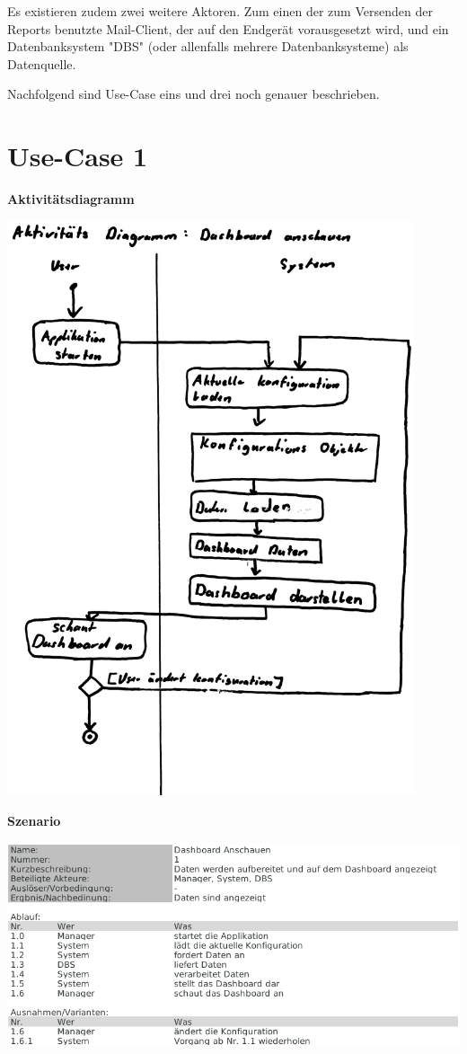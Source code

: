 \documentclass[a4paper]{scrreprt}
\begin{document}
Es existieren zudem zwei weitere Aktoren. Zum einen der zum Versenden der Reports benutzte Mail-Client, der auf den Endgerät vorausgesetzt wird, und ein Datenbanksystem "DBS" (oder allenfalls mehrere Datenbanksysteme) als Datenquelle.

\bigskip

Nachfolgend sind Use-Case eins und drei noch genauer beschrieben.


\pagebreak

\section{Use-Case 1}
\textbf{Aktivitätsdiagramm}

\includegraphics[width=0.9\textwidth]{uc-1_Dashboard/uc1_activity.jpg}


\pagebreak


\textbf{Szenario}

\includegraphics[width=1\textwidth]{uc-1_Dashboard/uc1_scenario.png}
\end{document}
